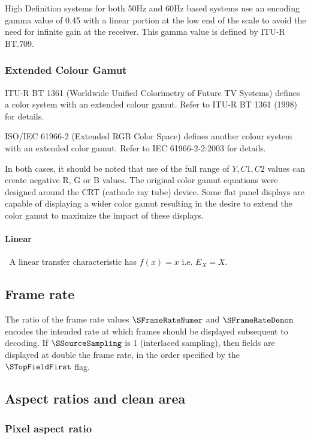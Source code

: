 \begin{informative*}
High Definition systems for both 50Hz and 60Hz based systems use an encoding
 gamma value of 0.45 with a linear portion at the low end of the scale to avoid
 the need for infinite gain at the receiver. This gamma value is defined by
ITU-R BT.709.

\subsubsection{Extended Colour Gamut}

ITU-R BT 1361 (Worldwide Unified Colorimetry of Future TV Systems) defines a
 color system with an extended colour gamut. Refer to ITU-R BT 1361 (1998) 
for details.

ISO/IEC 61966-2 (Extended RGB Color Space) defines another colour system with
 an extended color gamut. Refer to IEC 61966-2-2:2003 for details.

In both cases, it should be noted that use of the full range of $Y, C1, C2$
 values can create negative R, G or B values. The original color gamut equations
 were designed around the CRT (cathode ray tube) device. Some flat panel
displays are capable of displaying a wider color gamut resulting in the desire 
to extend the color gamut to maximize the impact of these displays.

\paragraph{Linear}
$\ $\newline
A linear transfer characteristic has $f(x)=x$ i.e. $E_X=X$. 

\subsection{Frame rate}
The ratio of the frame rate values $\SFrameRateNumer$ and $\SFrameRateDenom$
 encodes the intended rate at which frames should be
displayed subsequent to decoding. If $\SSourceSampling$ is 1 (interlaced
 sampling),  then fields are displayed at double the frame rate, in the order specified by the $\STopFieldFirst$ flag.

\subsection{Aspect ratios and clean area}

\subsubsection{Pixel aspect ratio}


\end{informative*}
